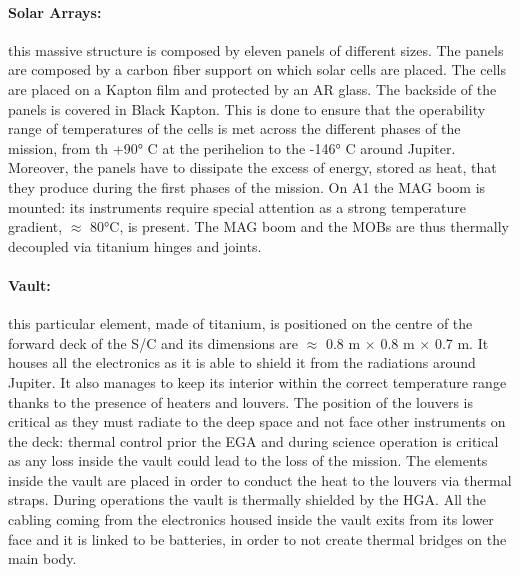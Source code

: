 \vspace{-4mm}

\paragraph{Solar Arrays:} this massive structure is composed by eleven panels of different sizes. The panels are composed by a carbon fiber support on which solar cells are placed. The cells are placed on a Kapton film and protected by an AR glass. The backside of the panels is covered in Black Kapton. This is done to ensure that the operability range of temperatures of the cells is met across the different phases of the mission, from th +90° C at the perihelion to the -146° C around Jupiter.\cite{pannelli} Moreover, the panels have to dissipate the excess of energy, stored as heat, that they produce during the first phases of the mission. On A1 the MAG boom is mounted: its instruments require special attention as a strong temperature gradient,  $\approx$ 80°C, is present.\cite{pannelli}
The MAG boom and the MOBs are thus thermally decoupled via titanium hinges and joints.\cite{pannelli}

\vspace{-4mm}

\paragraph{Vault:}this particular element, made of titanium, is positioned on the centre of the forward deck of the S/C and its dimensions are  $\approx$ 0.8 m $\times$ 0.8 m $\times$ 0.7 m.\cite{Rad_vault} It houses all the electronics as it is able to shield it from the radiations around Jupiter. It also manages to keep its interior within the correct temperature range thanks to the presence of heaters and louvers. The position of the louvers is critical as they must radiate to the deep space and not face other instruments on the deck: thermal control prior the EGA and during science operation is critical as any loss inside the vault could lead to the loss of the mission. The elements inside the vault are placed in order to conduct the heat to the louvers via thermal straps.\cite{louvers} During operations the vault is thermally shielded by the HGA. All the cabling coming from the electronics housed inside the vault exits from its lower face and it is linked to be batteries, in order to not create thermal bridges on the main body.

\vspace{-4mm}

